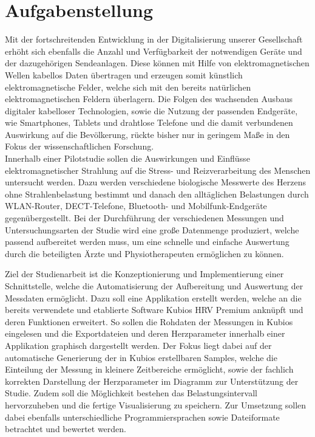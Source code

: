 
\chapter{Aufgabenstellung}

Mit der fortschreitenden Entwicklung in der Digitalisierung unserer Gesellschaft erhöht sich ebenfalls die Anzahl und Verfügbarkeit der notwendigen Geräte und der dazugehörigen Sendeanlagen. Diese können mit Hilfe von elektromagnetischen Wellen kabellos Daten übertragen und erzeugen somit künstlich elektromagnetische Felder, welche sich mit den bereits natürlichen elektromagnetischen Feldern überlagern. Die Folgen des wachsenden Ausbaus digitaler kabelloser Technologien, sowie die Nutzung der passenden Endgeräte, wie Smartphones, Tablets und drahtlose Telefone und die damit verbundenen Auswirkung auf die Bevölkerung, rückte bisher nur in geringem Maße in den Fokus der wissenschaftlichen Forschung.\\
Innerhalb einer Pilotstudie sollen die Auswirkungen und Einflüsse elektromagnetischer Strahlung auf die Stress- und Reizverarbeitung des Menschen untersucht werden. Dazu werden verschiedene biologische Messwerte des Herzens ohne Strahlenbelastung bestimmt und danach den alltäglichen Belastungen durch WLAN-Router, DECT-Telefone, Bluetooth- und Mobilfunk-Endgeräte gegenübergestellt. Bei der Durchführung der verschiedenen Messungen und Untersuchungsarten der Studie wird eine große Datenmenge produziert, welche passend aufbereitet werden muss, um eine schnelle und einfache Auswertung durch die beteiligten Ärzte und Physiotherapeuten ermöglichen zu können.

Ziel der Studienarbeit ist die Konzeptionierung und Implementierung einer Schnittstelle, welche die Automatisierung der Aufbereitung und Auswertung der Messdaten ermöglicht. Dazu soll eine Applikation erstellt werden, welche an die bereits verwendete und etablierte Software Kubios HRV Premium anknüpft und deren Funktionen erweitert. So sollen die Rohdaten der Messungen in Kubios eingelesen und die Exportdateien und deren Herzparameter innerhalb einer Applikation graphisch dargestellt werden. Der Fokus liegt dabei auf der automatische Generierung der in Kubios erstellbaren Samples, welche die Einteilung der Messung in kleinere Zeitbereiche ermöglicht, sowie der fachlich korrekten Darstellung der Herzparameter im Diagramm zur Unterstützung der Studie. Zudem soll die Möglichkeit bestehen das Belastungsintervall hervorzuheben und die fertige Visualisierung zu speichern. Zur Umsetzung sollen dabei ebenfalls unterschiedliche Programmiersprachen sowie Dateiformate betrachtet und bewertet werden. 